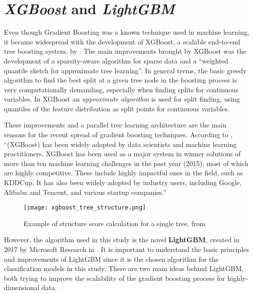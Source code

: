 \section{\textit{XGBoost} and \textit{LightGBM}}
\label{lightgbm-explanation}

Even though Gradient Boosting was a known technique used in machine learning, it became widespread with the development of XGBoost, a scalable end-to-end tree boosting system, by \cite{chen2016xgboost}. The main improvements brought by XGBoost was the development of a sparsity-aware algorithm for sparse data and a ``weighted quantile sketch for approximate tree learning''. In general terms, the basic greedy algorithm to find the best split at a given tree node in the boosting process is very computationally demanding, especially when finding splits for continuous variables. In XGBoost an \textit{approximate algorithm} is used for split finding, using quantiles of the feature distribution as split points for continuous variables. 

These improvements and a parallel tree learning architecture are the main reasons for the recent spread of gradient boosting techniques. According to \cite{chen2015xgboost}, ``(XGBoost) has been widely adopted by data scientists and machine learning practitioners. XGBoost has been used as a major system in winner solutions of more than ten machine learning challenges in the past year (2015), most of which are highly competitive. These include highly impactful ones in the field, such as KDDCup. It has also been widely adopted by industry users, including Google, Alibaba and Tencent, and various startup companies.''

\begin{figure}[!h]
    \centering
    \texttt{[image: xgboost\_tree\_structure.png]} 
    \caption{Example of structure score calculation for a single tree, from \cite{chen2015xgboost}}
    \label{fig:xgboost-tree} 
  \end{figure}
  

However, the algorithm used in this study is the novel \textbf{LightGBM}, created in 2017 by Microsoft Research in \cite{ke2017lightgbm}. It is important to understand the basic principles and improvements of LightGBM since it is the chosen algorithm for the classification models in this study. There are two main ideas behind LightGBM, both trying to improve the scalability of the gradient boosting process for highly-dimensional data.

